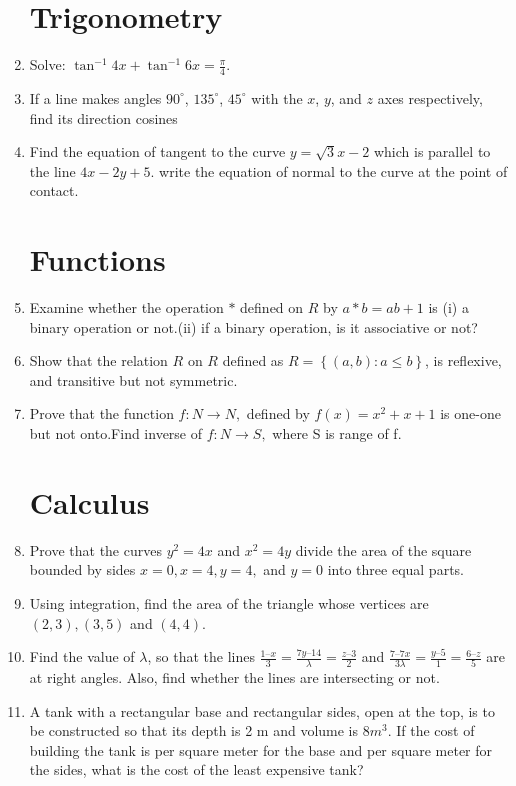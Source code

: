 \documentclass[12pt,-letter paper]{article}
\providecommand{\brak}[1]{\ensuremath{\left(#1\right)}}
\providecommand{\cbrak}[1]{\ensuremath{\left\{#1\right\}}}
\providecommand{\brak}[1]{\ensuremath{\left(#1\right)}}
\begin{document}
\begin{enumerate}
\section{Trigonometry}
\item Solve: $\tan^{-1}{4x}+\tan^{-1}{6x} = \frac{\pi}{4}$.
\item If a line makes angles $90^\circ$, $135^\circ$, $45^\circ$ with the $x$, $y$, and $z$ axes respectively, find its direction cosines
\item Find the equation of tangent to the curve $y = \sqrt 3x - 2 $ which is parallel to the line $4x - 2y + 5.$ write the equation of normal to the curve at the point of contact.
\section{Functions}
\item Examine whether the operation $*$ defined on ${R}$ by $a * b = ab + 1$ is
{(i)} a binary operation or not.{(ii)} if a binary operation, is it associative or not?
\item Show that the relation $R$ on ${R}$ defined as $R =\cbrak{{{\brak{a, b} : a \leq b}}}$, is reflexive, and transitive but not symmetric.
\item Prove that the function $f : N \rightarrow N,$ defined by $f{\brak{x}}=x^2 + x +1$ is one-one but not onto.Find inverse of $f : N\rightarrow S,$ where S is range of f.
\section{Calculus}
\item Prove that the curves $y^2 = 4x$ and $x^2 = 4y$ divide the area of the square bounded by sides $x=0,x=4,y=4,$ and $y=0$ into three equal parts.
\item Using integration, find the area of the triangle whose vertices are $\brak{2,3},\brak{3,5}$ and $\brak{4,4}$.
\item Find the value of $\lambda$, so that the lines $\frac{1–x}{3} = \frac{7y – 14}{\lambda} = \frac{z – 3}{2}$ and $\frac{7 – 7x}{3\lambda}  = \frac{y– 5}{1} =\frac{6 – z}{5}$ are at right angles. Also, find whether the lines are intersecting or not.
\item A tank with a rectangular base and rectangular sides, open at the top, is to be constructed so that its depth is 2 m and volume is $8{m}^3$. If the cost of building the tank is  per square meter for the base and  per square meter for the sides, what is the cost of the least expensive tank?

\end{enumerate}
\end{document}
